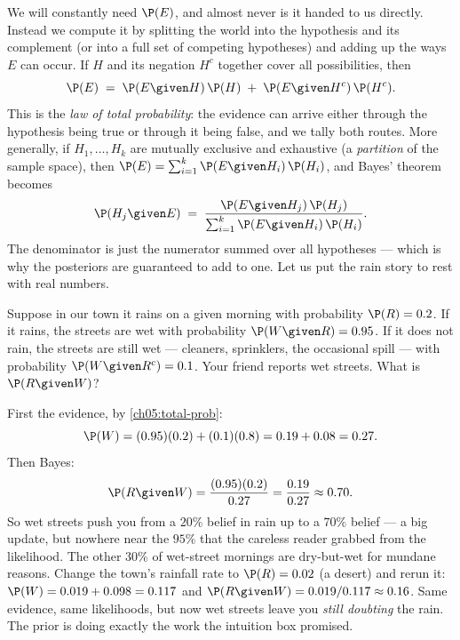 We will constantly need $\P(E)$, and almost never is it handed to us directly. Instead
we compute it by splitting the world into the hypothesis and its complement (or into a
full set of competing hypotheses) and adding up the ways $E$ can occur. If $H$ and its
negation $H^c$ together cover all possibilities, then
\begin{equation}
  \P(E) \;=\; \P(E \given H)\,\P(H) \;+\; \P(E \given H^c)\,\P(H^c).
  \label{ch05:total-prob}
\end{equation}
This is the \emph{law of total probability}: the evidence can arrive either through the
hypothesis being true or through it being false, and we tally both routes. More
generally, if $H_1, \dots, H_k$ are mutually exclusive and exhaustive (a \emph{partition}
of the sample space), then $\P(E) = \sum_{i=1}^{k} \P(E \given H_i)\,\P(H_i)$, and Bayes'
theorem becomes
\begin{equation}
  \P(H_j \given E) \;=\; \frac{\P(E \given H_j)\,\P(H_j)}
                              {\sum_{i=1}^{k} \P(E \given H_i)\,\P(H_i)}.
  \label{ch05:bayes-partition}
\end{equation}
The denominator is just the numerator summed over all hypotheses --- which is why the
posteriors are guaranteed to add to one. Let us put the rain story to rest with real
numbers.

\begin{example}
\label{ch05:ex-rain}
Suppose in our town it rains on a given morning with probability $\P(R) = 0.2$. If it
rains, the streets are wet with probability $\P(W \given R) = 0.95$. If it does not rain,
the streets are still wet --- cleaners, sprinklers, the occasional spill --- with
probability $\P(W \given R^c) = 0.1$. Your friend reports wet streets. What is
$\P(R \given W)$?

First the evidence, by \eqref{ch05:total-prob}:
\[
  \P(W) = (0.95)(0.2) + (0.1)(0.8) = 0.19 + 0.08 = 0.27.
\]
Then Bayes:
\[
  \P(R \given W) = \frac{(0.95)(0.2)}{0.27} = \frac{0.19}{0.27} \approx 0.70.
\]
So wet streets push you from a $20\%$ belief in rain up to a $70\%$ belief --- a big
update, but nowhere near the $95\%$ that the careless reader grabbed from the likelihood.
The other $30\%$ of wet-street mornings are dry-but-wet for mundane reasons. Change the
town's rainfall rate to $\P(R)=0.02$ (a desert) and rerun it: $\P(W) = 0.019 + 0.098 =
0.117$ and $\P(R\given W) = 0.019/0.117 \approx 0.16$. Same evidence, same likelihoods,
but now wet streets leave you \emph{still doubting} the rain. The prior is doing exactly
the work the intuition box promised.
\end{example}


